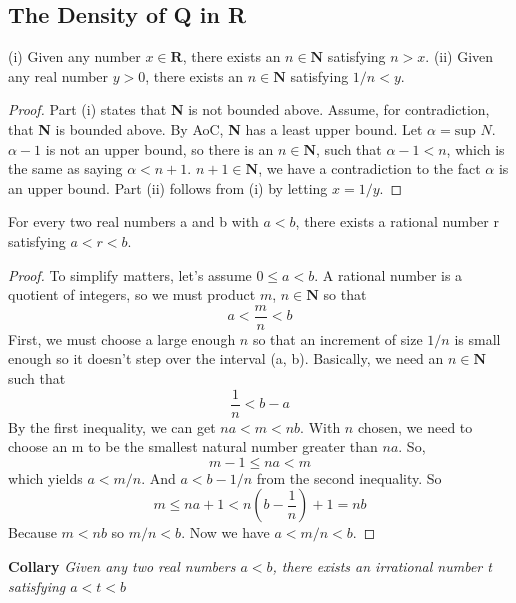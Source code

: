     \subsection*{The Density of Q in R}
        \begin{theorem}
            (i) Given any number $x \in \textbf{R}$, there exists an $n \in \textbf{N}$ satisfying $n > x$. 
            \newline \indent (ii) Given any real number $y > 0$, there exists an $n \in \textbf{N}$ satisfying $1/n < y$.
        \end{theorem}
        \begin{proof}
            Part (i) states that \textbf{N} is not bounded above. Assume, for contradiction, that \textbf{N} is bounded above. By AoC, \textbf{N} has a least upper bound. Let $\alpha = \text{sup } N$. $\alpha - 1$ is not an upper bound, so there is an $n \in \textbf{N}$, such that $\alpha - 1 < n$, which is the same as saying $\alpha < n + 1$. $n + 1 \in \textbf{N}$, we have a contradiction to the fact $\alpha$ is an upper bound. 
            \newline \indent Part (ii) follows from (i) by letting $x = 1 / y$.
        \end{proof}
        \begin{theorem}[Density of Q in R]
            For every two real numbers a and b with $a < b$, there exists a rational number r satisfying $a < r < b$.
        \end{theorem}
        \begin{proof}
            To simplify matters, let's assume $0 \leq a < b$. A rational number is a quotient of integers, so we must product $m$, $n \in \textbf{N}$ so that 
            \begin{equation*}
                a < \frac{m}{n} < b
            \end{equation*}
            First, we must choose a large enough $n$ so that an increment of size $1/n$ is small enough so it doesn't step over the interval (a, b). Basically, we need an $n \in \textbf{N}$ such that
            \begin{equation*}
                \frac{1}{n} < b - a
            \end{equation*}
            By the first inequality, we can get $na < m < nb$. With $n$ chosen, we need to choose an m to be the smallest natural number greater than $na$. So,
            \begin{equation*}
                m - 1 \leq na < m
            \end{equation*}
            which yields $a < m/n$. And $a < b - 1/n$ from the second inequality. So
            \begin{equation*}
                m \leq na + 1 < n(b - \frac{1}{n}) + 1 = nb
            \end{equation*}
            Because $m < nb$ so $m/n < b$. Now we have $a < m/n < b$.
        \end{proof}
        \textbf{Collary} \textit{Given any two real numbers $a < b$, there exists an irrational number t satisfying $a < t < b$}
